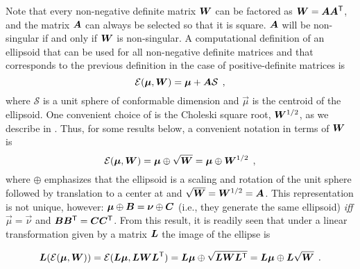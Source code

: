 Note that every non-negative definite matrix $\bm{W}$ can be factored as $\bm{W}=\bm{A}\bm{A}^\mathsf{T}$,
and the matrix $\bm{A}$ can always be selected so that it is square.
$\bm{A}$ will be non-singular if and only if $\bm{W}$ is non-singular.
A computational
definition of an ellipsoid that can be used for all non-negative definite matrices and that corresponds to the previous definition in the case of positive-definite matrices is
\begin{equation}
\mathcal{E}(\bm{\mu},\bm{W}) = \bm{\mu} + \bm{A} \mathcal{S} \:\: ,
\end{equation}
where $\mathcal{S}$ is a unit sphere of conformable dimension and $\vec{\mu}$ is the centroid of the ellipsoid.
One convenient choice of  is the Choleski square root, $\bm{W}^{1/2}$, as we describe in .
Thus, for some results below, a convenient notation in terms of $\bm{W}$ is
\begin{equation}\label{eq:ellipsoidW}
\mathcal{E}(\bm{\mu}, \bm{W}) = \bm{\mu} \oplus \sqrt{\bm{W}} = \bm{\mu} \oplus \bm{W}^{1/2} \:\: ,
\end{equation}
where $\oplus$
emphasizes that the ellipsoid is a scaling and rotation of the unit sphere followed by translation to
a center at \vec{\mu} and $\sqrt{\bm{W}}=\bm{W}^{1/2}=\bm{A}$. This representation is not unique,
however:  $\bm{\mu} \oplus \bm{B} = \bm{\nu} \oplus \bm{C}$ (i.e., they generate the same ellipsoid)
\emph{iff} $\vec{\mu} = \vec{\nu}$ and $\bm{B}\bm{B}^\mathsf{T} = \bm{C}\bm{C}^\mathsf{T}$.
From this result, it is readily seen that under a linear transformation given by a matrix
$\bm{L}$
the image of the ellipse is

\begin{equation*}
\bm{L}(\mathcal{E}(\bm{\mu} ,\bm{W}))=\mathcal{E}(\bm{L}\bm{\mu} ,\bm{L}\bm{W}{\bm{L}}^\mathsf{T})=\bm{L}\bm{\mu} \oplus \sqrt{\bm{L}\bm{W}{\bm{L}}^\mathsf{T}}=\bm{L}\bm{\mu} \oplus \bm{L}\sqrt{\bm{W}} \:\: .
\end{equation*}


